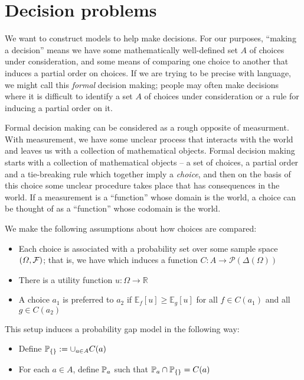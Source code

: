 
\section{Decision problems}

We want to construct models to help make decisions. For our purposes, ``making a decision'' means we have some mathematically well-defined set $A$ of choices under consideration, and some means of comparing one choice to another that induces a partial order on choices. If we are trying to be precise with language, we might call this \emph{formal} decision making; people may often make decisions where it is difficult to identify a set $A$ of choices under consideration or a rule for inducing a partial order on it.

Formal decision making can be considered as a rough opposite of measurment. With measurement, we have some unclear process that interacts with the world and leaves us with a collection of mathematical objects. Formal decision making starts with a collection of mathematical objects -- a set of choices, a partial order and a tie-breaking rule which together imply a \emph{choice}, and then on the basis of this choice some unclear procedure takes place that has consequences in the world. If a measurement is a ``function'' whose domain is the world, a choice can be thought of as a ``function'' whose codomain is the world.

We make the following assumptions about how choices are compared:
\begin{itemize}
    \item Each choice is associated with a probability set over some sample space $(\Omega,\mathcal{F})$; that is, we have which induces a function $C:A\to \mathscr{P}(\Delta(\Omega))$
    \item There is a utility function $u:\Omega\to \mathbb{R}$
    \item A choice $a_1$ is preferred to $a_2$ if $\mathbb{E}_{f}[u]\geq \mathbb{E}_{g}[u]$ for all $f\in C(a_1)$ and all $g\in C(a_2)$
\end{itemize}

This setup induces a probability gap model in the following way:

\begin{itemize}
    \item Define $\mathbb{P}_{\{\}}:=\cup_{a\in A} C(a)$
    \item For each $a\in A$, define $\mathbb{P}_a$ such that $\mathbb{P}_a\cap \mathbb{P}_{\{\}}= C(a)$
\end{itemize}

